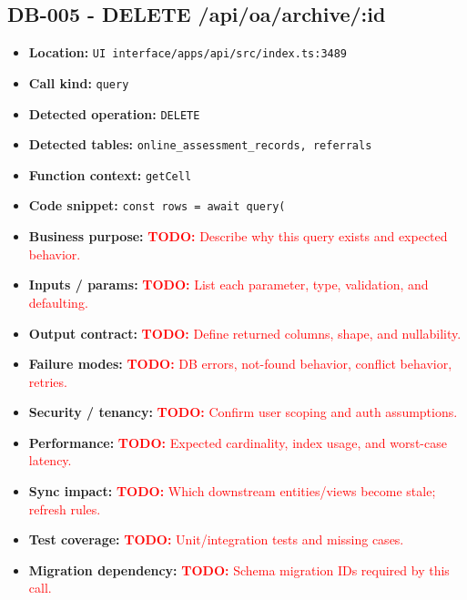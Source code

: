 \documentclass[11pt]{article}
\newcommand{\todoitem}[1]{\textcolor{red}{\textbf{TODO:} #1}}
\begin{document}
\subsection{DB-005 - DELETE /api/oa/archive/:id}
\begin{itemize}[leftmargin=1.5em]
\item \textbf{Location:} \texttt{UI interface/apps/api/src/index.ts:3489}
\item \textbf{Call kind:} \texttt{query}
\item \textbf{Detected operation:} \texttt{DELETE}
\item \textbf{Detected tables:} \texttt{online\_assessment\_records, referrals}
\item \textbf{Function context:} \texttt{getCell}
\item \textbf{Code snippet:} \texttt{const rows = await query(}
\item \textbf{Business purpose:} \todoitem{Describe why this query exists and expected behavior.}
\item \textbf{Inputs / params:} \todoitem{List each parameter, type, validation, and defaulting.}
\item \textbf{Output contract:} \todoitem{Define returned columns, shape, and nullability.}
\item \textbf{Failure modes:} \todoitem{DB errors, not-found behavior, conflict behavior, retries.}
\item \textbf{Security / tenancy:} \todoitem{Confirm user scoping and auth assumptions.}
\item \textbf{Performance:} \todoitem{Expected cardinality, index usage, and worst-case latency.}
\item \textbf{Sync impact:} \todoitem{Which downstream entities/views become stale; refresh rules.}
\item \textbf{Test coverage:} \todoitem{Unit/integration tests and missing cases.}
\item \textbf{Migration dependency:} \todoitem{Schema migration IDs required by this call.}
\end{itemize}
\end{document}
